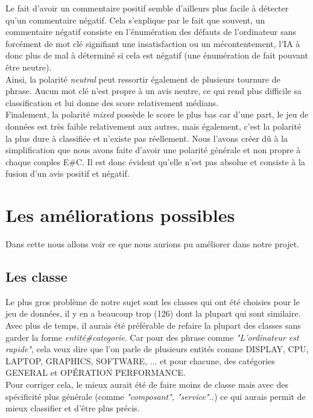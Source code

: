 \documentclass[12pt ,a4paper ]{article}
\begin{document}
\begin{multicols}{2}
Le fait d'avoir un commentaire positif semble d'ailleurs plus facile à détecter qu'un commentaire négatif. Cela s'explique par le fait que souvent, un commentaire négatif consiste en l'énumération des défauts de l'ordinateur sans forcément de mot clé signifiant une insatisfaction ou un mécontentement, l'IA à donc plus de mal à déterminé si cela est négatif (une énumération de fait pouvant être neutre). \\

Ainsi, la polarité \textit{neutral} peut ressortir également de plusieurs tournure de phrase. Aucun mot clé n'est propre à un avis neutre, ce qui rend plus difficile sa classification et lui donne des score relativement médians. \\

Finalement, la polarité \textit{mixed} possède le score le plus bas car d'une part, le jeu de données est très faible relativement aux autres, mais également, c'est la polarité la plus dure à classifiée et n'existe pas réellement. Nous l'avons créer dû à la simplification que nous avons faite d'avoir une polarité générale et non propre à chaque couples E\#C. Il est donc évident qu'elle n'est pas absolue et consiste à la fusion d'un avis positif et négatif. 

\newpage
\section{Les améliorations possibles}
Dans cette nous allons voir ce que nous aurions pu améliorer dans notre projet.

\subsection{Les classe}
Le plus gros problème de notre sujet sont les classes qui ont été choisies pour le jeu de données, il y en a beaucoup trop (126) dont la plupart qui sont similaire. Avec plus de temps, il aurais été préférable de refaire la plupart des classes sans garder la forme \textit{entité\#categorie}. Car pour des phrase comme \textit{"L'ordinateur est rapide"}, cela veux dire que l'on parle de plusieurs entités comme DISPLAY, CPU, LAPTOP, GRAPHICS, SOFTWARE, ... et pour chacune, des catégories GENERAL et OPÉRATION PERFORMANCE.\\
Pour corriger cela, le mieux aurait été de faire moins de classe mais avec des spécificité plus générale (comme \textit{"composant", "service"..}) ce qui aurais permit de mieux classifier et d'être plus précis.


\end{multicols}
\end{document}
